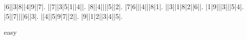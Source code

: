 \begin{sudoku}
|6||3|8||4|9||7|.
||7||3|5|1||4||.
|8||4||||5||2|.
|7|6|||4|||8|1|.
||3||1|8|2||6||.
|1|9|||3|||5|4|.
|5||7||||6||3|.
||4||5|9|7||2||.
|9||1|2||3|4||5|.
\end{sudoku}
\begin{center}
easy\end{center}